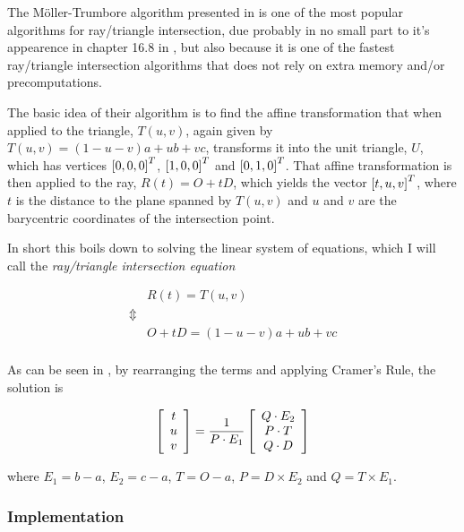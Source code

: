 
The Möller-Trumbore algorithm presented in 
is one of the most popular algorithms for ray/triangle intersection,
due probably in no small part to it's appearence in chapter 16.8 in
, but also because it is one of the fastest
ray/triangle intersection algorithms that does not rely on extra
memory and/or precomputations. 


The basic idea of their algorithm is to find the affine transformation
that when applied to the triangle, $T(u,v)$, again given by $T(u,v) =
(1-u-v)a + ub + vc$, transforms it into the unit triangle, $U$, which
has vertices $\left[0, 0, 0 \right]^T$, $\left[1, 0, 0 \right]^T$ and
$\left[0, 1, 0 \right]^T$. That affine transformation is then applied to
the ray, $R(t) = O + tD$, which yields the vector
$\left[t, u, v \right]^T$, where $t$ is the distance to the plane spanned
by $T(u,v)$ and $u$ and $v$ are the barycentric coordinates of the
intersection point.

In short this boils down to solving the linear system of equations,
which I will call the \textit{ray/triangle intersection equation}

\begin{displaymath}
  \begin{array}{rl}
    & R(t) = T(u,v) \\
    \Updownarrow \\
    & O + tD = (1-u-v)a + ub + vc \\
  \end{array}
\end{displaymath}

As can be seen in , by rearranging the
terms and applying Cramer's Rule, the solution is

\begin{displaymath}
  \left[\begin{array}{c} t \\ u \\ v \end{array}\right] = \frac{1}{P \cdot E_1} 
  \left[\begin{array}{c} Q \cdot E_2 \\ P \cdot T \\ Q \cdot D \end{array}\right]
\end{displaymath}

where $E_1 = b - a$, $E_2 = c - a$, $T = O - a$, $P = D \times  E_2$
and $Q = T \times  E_1$.

\subsubsection{Implementation}

